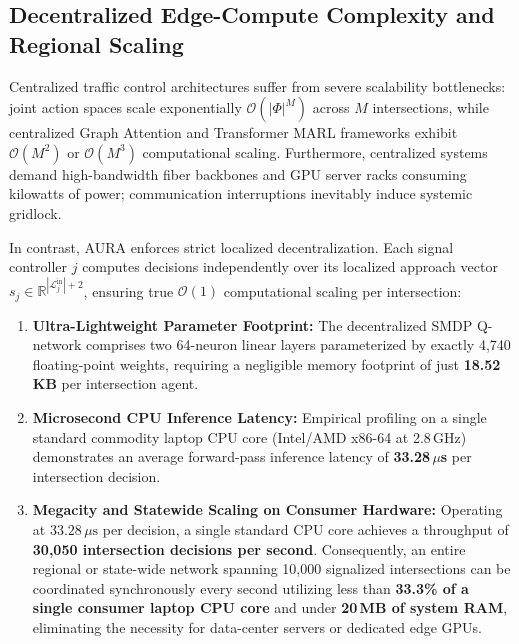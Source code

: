 \subsection{Decentralized Edge-Compute Complexity and Regional Scaling}
\label{sec:edge_complexity}
Centralized traffic control architectures suffer from severe scalability bottlenecks: joint action spaces scale exponentially $\mathcal{O}(|\Phi|^M)$ across $M$ intersections, while centralized Graph Attention and Transformer MARL frameworks exhibit $\mathcal{O}(M^2)$ or $\mathcal{O}(M^3)$ computational scaling. Furthermore, centralized systems demand high-bandwidth fiber backbones and GPU server racks consuming kilowatts of power; communication interruptions inevitably induce systemic gridlock.

In contrast, AURA enforces strict localized decentralization. Each signal controller $j$ computes decisions independently over its localized approach vector $s_j \in \mathbb{R}^{|\mathcal{L}_j^{\text{in}}| + 2}$, ensuring true $\mathcal{O}(1)$ computational scaling per intersection:
\begin{enumerate}
    \item \textbf{Ultra-Lightweight Parameter Footprint:} The decentralized SMDP Q-network comprises two 64-neuron linear layers parameterized by exactly 4,740 floating-point weights, requiring a negligible memory footprint of just \textbf{18.52\,KB} per intersection agent.
    \item \textbf{Microsecond CPU Inference Latency:} Empirical profiling on a single standard commodity laptop CPU core (Intel/AMD x86-64 at 2.8\,GHz) demonstrates an average forward-pass inference latency of \textbf{33.28\,$\mu$s} per intersection decision.
    \item \textbf{Megacity and Statewide Scaling on Consumer Hardware:} Operating at $33.28\,\mu\text{s}$ per decision, a single standard CPU core achieves a throughput of \textbf{30,050 intersection decisions per second}. Consequently, an entire regional or state-wide network spanning 10,000 signalized intersections can be coordinated synchronously every second utilizing less than \textbf{33.3\% of a single consumer laptop CPU core} and under \textbf{20\,MB of system RAM}, eliminating the necessity for data-center servers or dedicated edge GPUs.
\end{enumerate}
